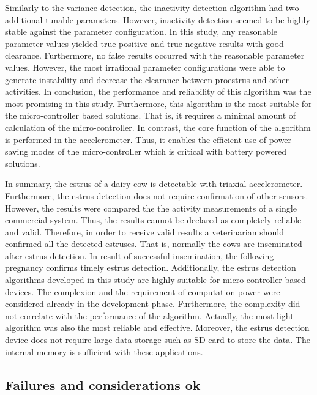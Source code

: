 \documentclass[english,12pt,a4paper,pdftex,elec,utf8]{aaltothesis}
\begin{document}
Similarly to the variance detection, the inactivity detection algorithm had two additional tunable parameters. However, inactivity detection seemed to be highly stable against the parameter configuration. In this study, any reasonable parameter values yielded true positive and true negative results with good clearance. Furthermore, no false results occurred with the reasonable parameter values. However, the most irrational parameter configurations were able to generate instability and decrease the clearance between proestrus and other activities. In conclusion, the performance and reliability of this algorithm was the most promising in this study. Furthermore, this algorithm is the most suitable for the micro-controller based solutions. That is, it requires a minimal amount of calculation of the micro-controller. In contrast, the core function of the algorithm is performed in the accelerometer. Thus, it enables the efficient use of power saving modes of the micro-controller which is critical with battery powered solutions. 

In summary, the estrus of a dairy cow is detectable with triaxial accelerometer. Furthermore, the estrus detection does not require confirmation of other sensors. However, the results were compared the the activity measurements of a single commercial system. Thus, the results cannot be declared as completely reliable and valid. Therefore, in order to receive valid results a veterinarian should confirmed all the detected estruses. That is, normally the cows are inseminated after estrus detection. In result of successful insemination, the following pregnancy confirms timely estrus detection. Additionally, the estrus detection algorithms developed in this study are highly suitable for micro-controller based devices. The complexion and the requirement of computation power were considered already in the development phase. Furthermore, the complexity did not correlate with the performance of the algorithm. Actually, the most light algorithm was also the most reliable and effective. Moreover, the estrus detection device does not require large data storage such as SD-card to store the data. The internal memory is sufficient with these applications.

\subsection{Failures and considerations ok}
\end{document}
